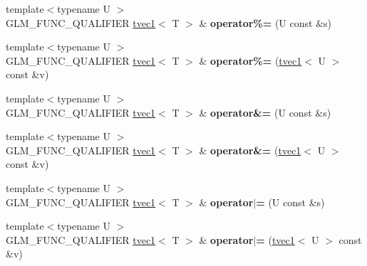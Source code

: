 \begin{DoxyCompactItemize}
\item 
\hypertarget{structglm_1_1detail_1_1tvec1_a9054b11d8059ccc1d388a0c6c2a8443c}{}{\footnotesize template$<$typename U $>$ }\\G\+L\+M\+\_\+\+F\+U\+N\+C\+\_\+\+Q\+U\+A\+L\+I\+F\+I\+E\+R \hyperlink{structglm_1_1detail_1_1tvec1}{tvec1}$<$ T $>$ \& {\bfseries operator\%=} (U const \&s)\label{structglm_1_1detail_1_1tvec1_a9054b11d8059ccc1d388a0c6c2a8443c}

\item 
\hypertarget{structglm_1_1detail_1_1tvec1_a3aa97cec6b84f307b81679b19ed37e70}{}{\footnotesize template$<$typename U $>$ }\\G\+L\+M\+\_\+\+F\+U\+N\+C\+\_\+\+Q\+U\+A\+L\+I\+F\+I\+E\+R \hyperlink{structglm_1_1detail_1_1tvec1}{tvec1}$<$ T $>$ \& {\bfseries operator\%=} (\hyperlink{structglm_1_1detail_1_1tvec1}{tvec1}$<$ U $>$ const \&v)\label{structglm_1_1detail_1_1tvec1_a3aa97cec6b84f307b81679b19ed37e70}

\item 
\hypertarget{structglm_1_1detail_1_1tvec1_ab81861a394d842d0801463785a373e77}{}{\footnotesize template$<$typename U $>$ }\\G\+L\+M\+\_\+\+F\+U\+N\+C\+\_\+\+Q\+U\+A\+L\+I\+F\+I\+E\+R \hyperlink{structglm_1_1detail_1_1tvec1}{tvec1}$<$ T $>$ \& {\bfseries operator\&=} (U const \&s)\label{structglm_1_1detail_1_1tvec1_ab81861a394d842d0801463785a373e77}

\item 
\hypertarget{structglm_1_1detail_1_1tvec1_aafbcfed9a10a7a73850adbff2395416a}{}{\footnotesize template$<$typename U $>$ }\\G\+L\+M\+\_\+\+F\+U\+N\+C\+\_\+\+Q\+U\+A\+L\+I\+F\+I\+E\+R \hyperlink{structglm_1_1detail_1_1tvec1}{tvec1}$<$ T $>$ \& {\bfseries operator\&=} (\hyperlink{structglm_1_1detail_1_1tvec1}{tvec1}$<$ U $>$ const \&v)\label{structglm_1_1detail_1_1tvec1_aafbcfed9a10a7a73850adbff2395416a}

\item 
\hypertarget{structglm_1_1detail_1_1tvec1_a07033352925336c5a38cfd7057f230fb}{}{\footnotesize template$<$typename U $>$ }\\G\+L\+M\+\_\+\+F\+U\+N\+C\+\_\+\+Q\+U\+A\+L\+I\+F\+I\+E\+R \hyperlink{structglm_1_1detail_1_1tvec1}{tvec1}$<$ T $>$ \& {\bfseries operator$\vert$=} (U const \&s)\label{structglm_1_1detail_1_1tvec1_a07033352925336c5a38cfd7057f230fb}

\item 
\hypertarget{structglm_1_1detail_1_1tvec1_a522b681892d89d7eea2d4173b90f9c71}{}{\footnotesize template$<$typename U $>$ }\\G\+L\+M\+\_\+\+F\+U\+N\+C\+\_\+\+Q\+U\+A\+L\+I\+F\+I\+E\+R \hyperlink{structglm_1_1detail_1_1tvec1}{tvec1}$<$ T $>$ \& {\bfseries operator$\vert$=} (\hyperlink{structglm_1_1detail_1_1tvec1}{tvec1}$<$ U $>$ const \&v)\label{structglm_1_1detail_1_1tvec1_a522b681892d89d7eea2d4173b90f9c71}


\end{DoxyCompactItemize}
